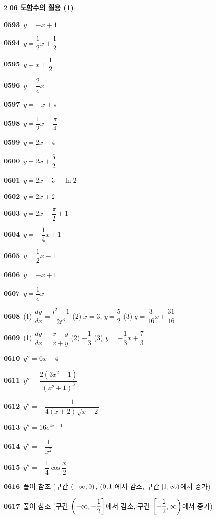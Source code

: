 \documentclass[10pt,a4paper]{article}
\begin{document}
\begin{multicols}{2}
\noindent\textbf{06 도함수의 활용 (1)}\par\smallskip
\noindent\textbf{0593}\ $y=-x+4$\par
\noindent\textbf{0594}\ $y=\dfrac{1}{2}x+\dfrac{1}{2}$\par
\noindent\textbf{0595}\ $y=x+\dfrac{1}{2}$\par
\noindent\textbf{0596}\ $y=\dfrac{2}{e}x$\par
\noindent\textbf{0597}\ $y=-x+\pi$\par
\noindent\textbf{0598}\ $y=\dfrac{1}{2}x-\dfrac{\pi}{4}$\par
\noindent\textbf{0599}\ $y=2x-4$\par
\noindent\textbf{0600}\ $y=2x+\dfrac{5}{2}$\par
\noindent\textbf{0601}\ $y=2x-3-\ln 2$\par
\noindent\textbf{0602}\ $y=2x+2$\par
\noindent\textbf{0603}\ $y=2x-\dfrac{\pi}{2}+1$\par
\noindent\textbf{0604}\ $y=-\dfrac{1}{4}x+1$\par
\noindent\textbf{0605}\ $y=\dfrac{1}{2}x-1$\par
\noindent\textbf{0606}\ $y=-x+1$\par
\noindent\textbf{0607}\ $y=\dfrac{1}{e}x$\par
\noindent\textbf{0608}\ (1) $\dfrac{dy}{dx}=\dfrac{t^2-1}{2t^3}$ (2) $x=3$, $y=\dfrac{5}{2}$ (3) $y=\dfrac{3}{16}x+\dfrac{31}{16}$\par
\noindent\textbf{0609}\ (1) $\dfrac{dy}{dx}=\dfrac{x-y}{x+y}$ (2) $-\dfrac{1}{3}$ (3) $y=-\dfrac{1}{3}x+\dfrac{7}{3}$\par
\noindent\textbf{0610}\ $y''=6x-4$\par
\noindent\textbf{0611}\ $y''=\dfrac{2(3x^2-1)}{(x^2+1)^3}$\par
\noindent\textbf{0612}\ $y''=-\dfrac{1}{4(x+2)\sqrt{x+2}}$\par
\noindent\textbf{0613}\ $y''=16e^{4x-1}$\par
\noindent\textbf{0614}\ $y''=-\dfrac{1}{x^2}$\par
\noindent\textbf{0615}\ $y''=-\dfrac{1}{4}\cos\dfrac{x}{2}$\par
\noindent\textbf{0616}\ 풀이 참조 (구간 $(-\infty{,}\mkern3mu\mathopen{}0)$, $(0{,}\mkern3mu\mathopen{}1]$에서 감소, 구간 $[1{,}\mkern3mu\mathopen{}\infty)$에서 증가)\par
\noindent\textbf{0617}\ 풀이 참조 (구간 $\left(-\infty{,}\mkern3mu\mathopen{}-\dfrac{1}{2}\right]$에서 감소, 구간 $\left[-\dfrac{1}{2}{,}\mkern3mu\mathopen{}\infty\right)$에서 증가)\par

\end{multicols}
\end{document}
